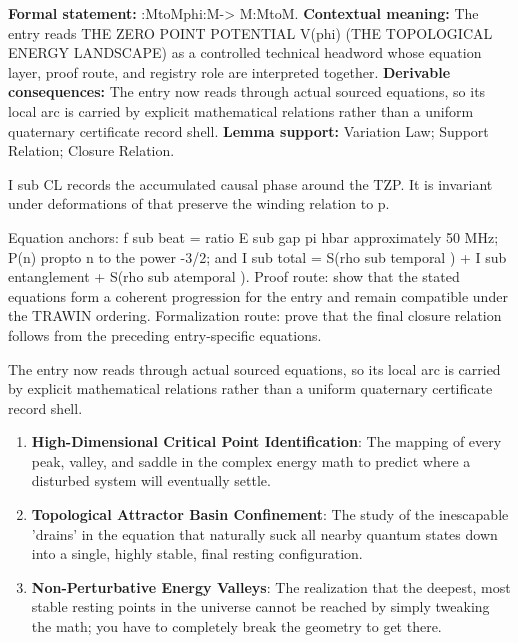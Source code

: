 \begingroup\footnotesize\setlength{\emergencystretch}{3em}\sloppy
\textbf{Formal statement:} :MtoMphi:M-> M:MtoM. \textbf{Contextual meaning:} The entry reads THE ZERO POINT POTENTIAL V(phi) (THE TOPOLOGICAL ENERGY LANDSCAPE) as a controlled technical headword whose equation layer, proof route, and registry role are interpreted together. \textbf{Derivable consequences:} The entry now reads through actual sourced equations, so its local arc is carried by explicit mathematical relations rather than a uniform quaternary certificate record shell. \textbf{Lemma support:} Variation Law; Support Relation; Closure Relation.\par
\endgroup

I sub CL records the accumulated causal phase around the TZP. It is invariant under deformations of that preserve the winding relation to p.

Equation anchors: f sub beat = ratio E sub gap pi hbar approximately 50 MHz; P(n) propto n to the power -3/2; and I sub total = S(rho sub temporal ) + I sub entanglement + S(rho sub atemporal ). Proof route: show that the stated equations form a coherent progression for the entry and remain compatible under the TRAWIN ordering. Formalization route: prove that the final closure relation follows from the preceding entry-specific equations.

The entry now reads through actual sourced equations, so its local arc is carried by explicit mathematical relations rather than a uniform quaternary certificate record shell.
\endgroup

\begin{enumerate}[leftmargin=1.6em,itemsep=6pt,topsep=4pt]
\item \textbf{High-Dimensional Critical Point Identification}: The mapping of every peak, valley, and saddle in the complex energy math to predict where a disturbed system will eventually settle.
\item \textbf{Topological Attractor Basin Confinement}: The study of the inescapable 'drains' in the equation that naturally suck all nearby quantum states down into a single, highly stable, final resting configuration.
\item \textbf{Non-Perturbative Energy Valleys}: The realization that the deepest, most stable resting points in the universe cannot be reached by simply tweaking the math; you have to completely break the geometry to get there.
\end{enumerate}

